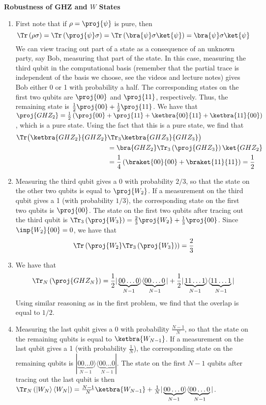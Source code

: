 \begin{exercises}
\item {\bf Robustness of GHZ and $W$ States}\label{ex:robust-GHZ}
\begin{enumerate}
\item
	First note that if $\rho = \proj{\psi}$ is pure, then
	\[\Tr\left(\rho \sigma\right) = \Tr\left(\proj{\psi} \sigma\right) = \Tr\left(\bra{\psi} \sigma\ket{\psi}\right) = \bra{\psi} \sigma\ket{\psi}\]
	We can view tracing out part of a state as a consequence of an unknown party, say Bob, measuring that part of the state. In this case, measuring the third qubit in the computational basis (remember that the partial trace is independent of the basis we choose, see the videos and lecture notes) gives Bob either 0 or 1 with probability a half. The corresponding states on the first two qubits are $\proj{00}$ and $\proj{11}$, respectively. Thus, the remaining state is $\frac{1}{2}\proj{00}+\frac{1}{2}\proj{11}$.
	We have that $\proj{GHZ_2} = \frac{1}{2}\left(\proj{00}+\proj{11}+\ketbra{00}{11}+\ketbra{11}{00} \right)$, which is a pure state. Using the fact that this is a pure state, we find that
	\begin{align*}
		\Tr\big(\ketbra{GHZ_2}{GHZ_2} & \Tr_3\ketbra{GHZ_3}{GHZ_3}\big) \\
		& = \bra{GHZ_2} \Tr_3 \left(\proj{GHZ_3}\right)\ket{GHZ_2}\\
		& = \frac{1}{4}\left(\braket{00}{00}+\braket{11}{11}\right)=\frac{1}{2}
	\end{align*}
\item
	Measuring the third qubit gives a 0 with probability $2/3$, so that the state on the other two qubits is equal to $\proj{W_2}$. If a measurement on the third qubit gives a 1 (with probability $1/3$), the corresponding state on the first two qubits is $\proj{00}$. The state on the first two qubits after tracing out the third qubit is $\Tr_3\left(\proj{W_3}\right) = \frac{2}{3}\proj{W_2}+\frac{1}{3}\proj{00}$.
	Since $\inp{W_2}{00} = 0$, we have that $$\Tr\left(\proj{W_2} \Tr_3\left(\proj{W_3}\right)\right) = \frac{2}{3}$$
\item
	We have that
	\[\Tr_N \left(\proj{GHZ_N}\right) = \frac{1}{2}|\underbrace{00\ldots0}_{N-1}\rangle\langle\underbrace{00\ldots0}_{N-1}|+\frac{1}{2}|\underbrace{11\ldots1}_{N-1}\rangle\langle\underbrace{11\ldots1}_{N-1}|\]
	Using similar reasoning as in the first problem, we find that the overlap is equal to $1/2$.
\item	
	Measuring the last qubit gives a $0$ with probability $\frac{N-1}{N}$, so that the state on the remaining qubits is equal to $\ketbra{W_{N-1}}$. If a measurement on the last qubit gives a 1 (with probability $\frac{1}{N}$), the corresponding state on the remaining qubits is $|\underbrace{00\ldots0}_{N-1}\rangle \langle\underbrace{00\ldots0}_{N-1} |$. The state on the first $N-1$ qubits after tracing out the last qubit is then $\Tr_N\left(\left| W_N \right\rangle \left\langle W_N \right|\right) = \frac{N-1}{N}\ketbra{W_{N-1}}+\frac{1}{N}|\underbrace{00\ldots0}_{N-1}\rangle \langle \underbrace{00\ldots0}_{N-1}|$.

\end{enumerate}
\end{exercises}
